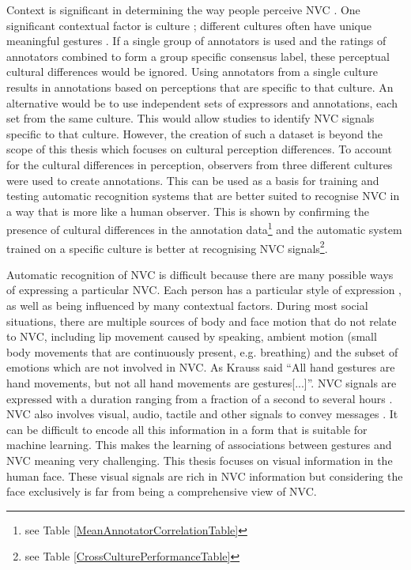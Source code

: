 Context is significant in determining the way people perceive \ac{NVC} \cite{Hoque2009}. One significant contextual factor is culture \cite{Matsumoto08}; different cultures often have unique meaningful gestures \cite{Matsumoto2006}. If a single group of annotators is used and the ratings of annotators combined to form a group specific consensus label, these perceptual cultural differences would be ignored. Using annotators from a single culture results in annotations based on perceptions that are specific to that culture. An alternative would be to use independent sets of expressors and annotations, each set from the same culture. This would allow studies to identify \ac{NVC} signals specific to that culture. However, the creation of such a dataset is beyond the scope of this thesis which focuses on cultural perception differences. To account for the cultural differences in perception, observers from three different cultures were used to create \culturallySpecific annotations. This can be used as a basis for training and testing automatic recognition systems that are better suited to recognise \ac{NVC} in a way that is more like a human observer. This is shown by confirming the presence of cultural differences in the annotation data\footnote{see Table \ref{MeanAnnotatorCorrelationTable}} and the automatic system trained on a specific culture is better at recognising \ac{NVC} signals\footnote{see Table \ref{CrossCulturePerformanceTable}}.

Automatic recognition of \ac{NVC} is difficult because there are many possible ways of expressing a particular \ac{NVC}. Each person has a particular style of expression \cite{Buck1979}, as well as being influenced by many contextual factors. During most social situations, there are multiple sources of body and face motion that do not relate to \ac{NVC}, including lip movement caused by speaking, ambient motion (small body movements that are continuously present, e.g. breathing) and the subset of emotions which are not involved in \ac{NVC}. As Krauss \etal \cite{Krauss1996} said ``All hand gestures are hand movements, but not all hand movements are gestures[...]''.  \ac{NVC} signals are expressed with a duration ranging from a fraction of a second to several hours \cite{Aaron1997, Verduyn2009}. \ac{NVC} also involves visual, audio, tactile and other signals to convey messages \cite{Knapp2009}. It can be difficult to encode all this information in a form that is suitable for machine learning. This makes the learning of associations between gestures and \ac{NVC} meaning very challenging. This thesis focuses on visual information in the human face. These visual signals are rich in \ac{NVC} information but considering the face exclusively is far from being a comprehensive view of \ac{NVC}.

